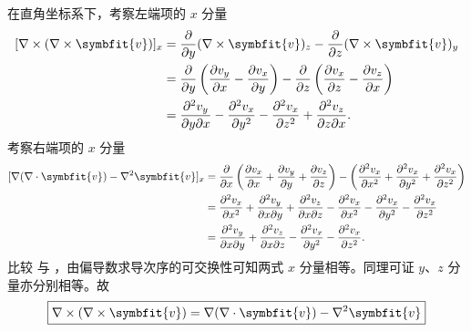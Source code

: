 \begin{myproof}

    在直角坐标系下，考察左端项的 $x$ 分量
    \begin{equation}\label{eq:curl-curl-lhs}
        \begin{aligned}
            \relax [\nabla \times (\nabla \times \symbfit{v})]_x & = \frac{\partial}{\partial y} (\nabla \times \symbfit{v})_z - \frac{\partial}{\partial z} (\nabla \times \symbfit{v})_y                                                                                                       \\
                                                                 & = \frac{\partial}{\partial y} \left( \frac{\partial v_y}{\partial x} - \frac{\partial v_x}{\partial y} \right) - \frac{\partial}{\partial z} \left( \frac{\partial v_x}{\partial z} - \frac{\partial v_z}{\partial x} \right) \\
                                                                 & = \frac{\partial^2 v_y}{\partial y \partial x} - \frac{\partial^2 v_x}{\partial y^2} - \frac{\partial^2 v_x}{\partial z^2} + \frac{\partial^2 v_z}{\partial z \partial x}.
        \end{aligned}
    \end{equation}
    考察右端项的 $x$ 分量
    \begin{equation}\label{eq:curl-curl-rhs}
        \begin{aligned}
            \relax [\nabla (\nabla \cdot \symbfit{v}) - \nabla^2 \symbfit{v}]_x & = \frac{\partial}{\partial x} \left( \frac{\partial v_x}{\partial x} + \frac{\partial v_y}{\partial y} + \frac{\partial v_z}{\partial z} \right) - \left( \frac{\partial^2 v_x}{\partial x^2} + \frac{\partial^2 v_x}{\partial y^2} + \frac{\partial^2 v_x}{\partial z^2} \right) \\
                                                                                & = \frac{\partial^2 v_x}{\partial x^2} + \frac{\partial^2 v_y}{\partial x \partial y} + \frac{\partial^2 v_z}{\partial x \partial z} - \frac{\partial^2 v_x}{\partial x^2} - \frac{\partial^2 v_x}{\partial y^2} - \frac{\partial^2 v_x}{\partial z^2}                             \\
                                                                                & = \frac{\partial^2 v_y}{\partial x \partial y} + \frac{\partial^2 v_z}{\partial x \partial z} - \frac{\partial^2 v_x}{\partial y^2} - \frac{\partial^2 v_x}{\partial z^2}.
        \end{aligned}
    \end{equation}
    比较  与 ，由偏导数求导次序的可交换性可知两式 $x$ 分量相等。同理可证 $y$、$z$ 分量亦分别相等。故
    \begin{equation}\label{eq:curl-curl-final}
        \boxed{\nabla \times (\nabla \times \symbfit{v}) = \nabla (\nabla \cdot \symbfit{v}) - \nabla^2 \symbfit{v}}
    \end{equation}
\end{myproof}

\endinput
